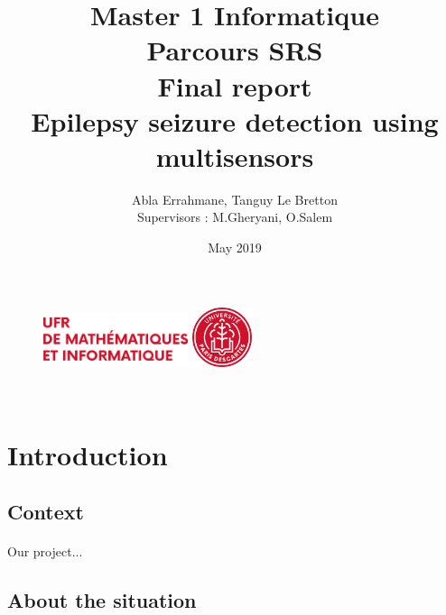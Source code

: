 \documentclass[11pt]{article}
\title{	\LARGE Master 1 Informatique \\
	Parcours SRS \\ 
	\vspace{20mm} 
\Huge	\textbf{Final report} \\ 
	\vspace{20mm} 
\Huge	\textbf{Epilepsy seizure detection using multisensors}
}
\author{Abla Errahmane, Tanguy Le Bretton \\ \vspace{5mm} Supervisors : M.Gheryani, O.Salem}
\date{May 2019}
\begin{document}
\begin{figure}[t]
	\includegraphics[width=120pt]{MI_logo.png}
	\includegraphics[width=50pt]{Descartes_logo.png}

\end{figure}

\maketitle

\newpage
~
\newpage
\tableofcontents
\newpage


\section{Introduction}
\subsection{Context}
\paragraph{}
Our project...

\subsection{About the situation}
\paragraph{}
\end{document}

